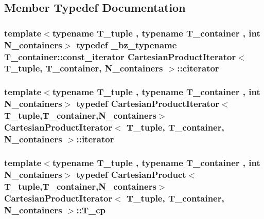 \subsection{Member Typedef Documentation}
\hypertarget{classCartesianProductIterator_a8cfe16c0d4694b851a0084e1c309c896}{}
\subsubsection[{citerator}]{\setlength{\rightskip}{0pt plus 5cm}template$<$typename T\+\_\+tuple , typename T\+\_\+container , int N\+\_\+containers$>$ typedef {\bf \+\_\+bz\+\_\+typename} T\+\_\+container\+::const\+\_\+iterator {\bf Cartesian\+Product\+Iterator}$<$ T\+\_\+tuple, T\+\_\+container, N\+\_\+containers $>$\+::{\bf citerator}}\label{classCartesianProductIterator_a8cfe16c0d4694b851a0084e1c309c896}
\hypertarget{classCartesianProductIterator_a68eb421dce636a204a0e0b97eaf01e4b}{}
\subsubsection[{iterator}]{\setlength{\rightskip}{0pt plus 5cm}template$<$typename T\+\_\+tuple , typename T\+\_\+container , int N\+\_\+containers$>$ typedef {\bf Cartesian\+Product\+Iterator}$<$T\+\_\+tuple,T\+\_\+container,N\+\_\+containers$>$ {\bf Cartesian\+Product\+Iterator}$<$ T\+\_\+tuple, T\+\_\+container, N\+\_\+containers $>$\+::{\bf iterator}}\label{classCartesianProductIterator_a68eb421dce636a204a0e0b97eaf01e4b}
\hypertarget{classCartesianProductIterator_a4aca90c681d7dffbe5082c6ec9bda77e}{}
\subsubsection[{T\+\_\+cp}]{\setlength{\rightskip}{0pt plus 5cm}template$<$typename T\+\_\+tuple , typename T\+\_\+container , int N\+\_\+containers$>$ typedef {\bf Cartesian\+Product}$<$T\+\_\+tuple,T\+\_\+container,N\+\_\+containers$>$ {\bf Cartesian\+Product\+Iterator}$<$ T\+\_\+tuple, T\+\_\+container, N\+\_\+containers $>$\+::{\bf T\+\_\+cp}}\label{classCartesianProductIterator_a4aca90c681d7dffbe5082c6ec9bda77e}


